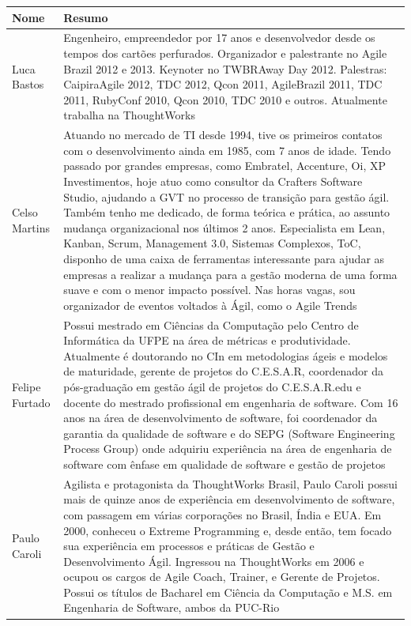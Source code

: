 \begin{tabularx}{\linewidth}{ | p{4cm} | X | } \hline \textbf{Nome} & \textbf{Resumo} \\ \hline
	Luca Bastos & Engenheiro, empreendedor por 17 anos e desenvolvedor desde os tempos dos cartões perfurados. Organizador e palestrante no Agile Brazil 2012 e 2013. Keynoter no TWBRAway Day 2012. Palestras: CaipiraAgile 2012, TDC 2012, Qcon 2011, AgileBrazil 2011, TDC 2011, RubyConf 2010, Qcon 2010, TDC 2010 e outros. Atualmente trabalha na ThoughtWorks \\ \hline
	Celso Martins & Atuando no mercado de TI desde 1994, tive os primeiros contatos com o desenvolvimento ainda em 1985, com 7 anos de idade. Tendo passado por grandes empresas, como Embratel, Accenture, Oi, XP Investimentos, hoje atuo como consultor da Crafters Software Studio, ajudando a GVT no processo de transição para gestão ágil. Também tenho me dedicado, de forma teórica e prática, ao assunto mudança organizacional nos últimos 2 anos. Especialista em Lean, Kanban, Scrum, Management 3.0, Sistemas Complexos, ToC, disponho de uma caixa de ferramentas interessante para ajudar as empresas a realizar a mudança para a gestão moderna de uma forma suave e com o menor impacto possível. Nas horas vagas, sou organizador de eventos voltados à Ágil, como o Agile Trends \\ \hline
	Felipe Furtado & Possui mestrado em Ciências da Computação pelo Centro de Informática da UFPE na área de métricas e produtividade. Atualmente é doutorando no CIn em metodologias ágeis e modelos de maturidade, gerente de projetos do C.E.S.A.R, coordenador da pós-graduação em gestão ágil de projetos do C.E.S.A.R.edu e docente do mestrado profissional em engenharia de software. Com 16 anos na área de desenvolvimento de software, foi coordenador da garantia da qualidade de software e do SEPG (Software Engineering Process Group) onde adquiriu experiência na área de engenharia de software com ênfase em qualidade de software e gestão de projetos \\ \hline
	Paulo Caroli & Agilista e protagonista da ThoughtWorks Brasil, Paulo Caroli possui mais de quinze anos de experiência em desenvolvimento de software, com passagem em várias corporações no Brasil, Índia e EUA. Em 2000, conheceu o Extreme Programming e, desde então, tem focado sua experiência em processos e práticas de Gestão e Desenvolvimento Ágil. Ingressou na ThoughtWorks em 2006 e ocupou os cargos de Agile Coach, Trainer, e Gerente de Projetos. Possui os títulos de Bacharel em Ciência da Computação e M.S. em Engenharia de Software, ambos da PUC-Rio \\ \hline

\end{tabularx}
